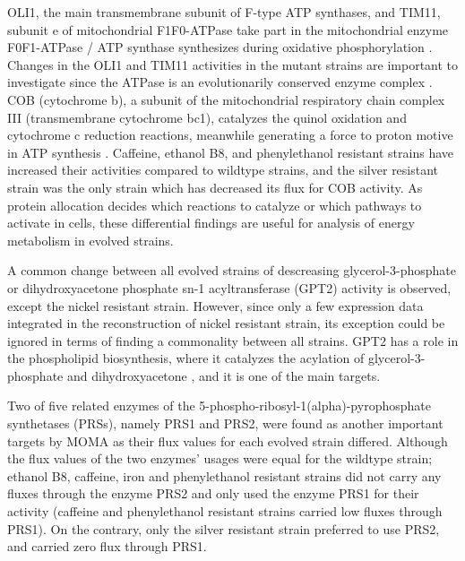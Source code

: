OLI1, the main transmembrane subunit of F-type ATP synthases, and TIM11, subunit e of mitochondrial F1F0-ATPase take part in the mitochondrial enzyme F0F1-ATPase / ATP synthase synthesizes during oxidative phosphorylation \cite{arnold1997yeast, trembath1975biogenesis}. Changes in the OLI1 and TIM11 activities in the mutant strains  are important to investigate since the ATPase is an evolutionarily conserved enzyme complex \cite{tokatlidis1996translocation}. COB (cytochrome b), a subunit of the mitochondrial respiratory chain complex III (transmembrane cytochrome bc1), catalyzes the quinol oxidation and cytochrome c reduction reactions, meanwhile generating a force to proton motive in ATP synthesis \cite{meunier2013respiratory}. Caffeine, ethanol B8, and phenylethanol resistant strains have increased their activities compared to wildtype strains, and the silver resistant strain was the only strain which has decreased its flux for COB activity. As protein allocation decides which reactions to catalyze or which pathways to activate in cells, these differential findings are useful for analysis of energy metabolism in evolved strains.

A common change between all evolved strains of descreasing glycerol-3-phosphate or dihydroxyacetone phosphate sn-1 acyltransferase (GPT2) activity is observed, except the nickel resistant strain. However, since only a few expression data integrated in the reconstruction of nickel resistant strain, its exception could be ignored in terms of finding a commonality between all strains. GPT2 has a role in the phospholipid biosynthesis, where it catalyzes the acylation of glycerol-3-phosphate and dihydroxyacetone \cite{athenstaedt1997biosynthesis}, and it is one of the main targets.

Two of five related enzymes of the 5-phospho-ribosyl-1(alpha)-pyrophosphate synthetases (PRSs), namely PRS1 and PRS2, were found as another important targets by MOMA as their flux values for each evolved strain differed. Although the flux values of the two enzymes' usages were equal for the wildtype strain; ethanol B8, caffeine, iron and phenylethanol resistant strains did not carry any fluxes through the enzyme PRS2 and only used the enzyme PRS1 for their activity (caffeine and phenylethanol resistant strains carried low fluxes through PRS1). On the contrary, only the silver resistant strain preferred to use PRS2, and carried zero flux through PRS1.

